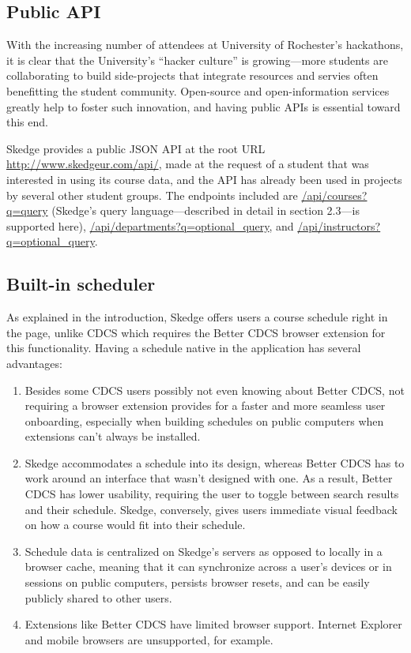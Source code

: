 \subsection{Public API}

With the increasing number of attendees at University of Rochester's hackathons, it is clear that the University's ``hacker culture'' is growing---more students are collaborating to build side-projects that integrate resources and servies often benefitting the student community. Open-source and open-information services greatly help to foster such innovation, and having public APIs is essential toward this end.\cite{Milberry}\cite{hackers}

Skedge provides a public JSON API at the root URL \url{http://www.skedgeur.com/api/}, made at the request of a student that was interested in using its course data, and the API has already been used in projects by several other student groups. The endpoints included are \url{/api/courses?q=query} (Skedge's query language---described in detail in section 2.3---is supported here), \url{/api/departments?q=optional_query}, and \url{/api/instructors?q=optional_query}.

\subsection{Built-in scheduler}

As explained in the introduction, Skedge offers users a course schedule right in the page, unlike CDCS which requires the Better CDCS browser extension for this functionality. Having a schedule native in the application has several advantages:

\begin{enumerate}
\item Besides some CDCS users possibly not even knowing about Better CDCS, not requiring a browser extension provides for a faster and more seamless user onboarding, especially when building schedules on public computers when extensions can't always be installed.

\item Skedge accommodates a schedule into its design, whereas Better CDCS has to work around an interface that wasn't designed with one. As a result, Better CDCS has lower usability, requiring the user to toggle between search results and their schedule. Skedge, conversely, gives users immediate visual feedback on how a course would fit into their schedule.

\item Schedule data is centralized on Skedge's servers as opposed to locally in a browser cache, meaning that it can synchronize across a user's devices or in sessions on public computers, persists browser resets, and can be easily publicly shared to other users.

\item Extensions like Better CDCS have limited browser support. Internet Explorer and mobile browsers are unsupported, for example.
\end{enumerate}
